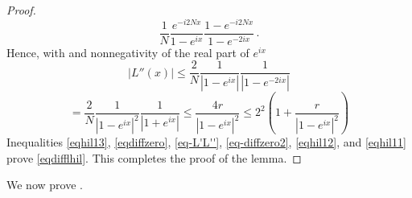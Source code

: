\begin{proof}
\begin{equation}
           \frac 1N \frac {e^{-i2Nx}}{1-e^{ix}}
     \frac{1-e^{-i2Nx}}{1-e^{-2ix}}\, .
\end{equation}
Hence, with  and nonnegativity of the real part of $e^{ix}$
\begin{equation*}
    |L''(x)|
 \le \frac 2 N \frac {1}{|1-e^{ix}|}
     \frac{1}{|1-e^{-2ix}|}
 \end{equation*}
\begin{equation}\label{eqhil11}
    = \frac 2 N \frac {1}{|1-e^{ix}|^2}
     \frac{1}{|1+e^{ix}|}\le
 \frac {4r}{|1-e^{ix}|^2}\le 2^{2} \left(1+\frac {r}{|1-e^{ix}|^2}\right)
\end{equation}
Inequalities \eqref{eqhil13}, \eqref{eqdiffzero}, \eqref{eq-L'L''}, \eqref{eq-diffzero2}, \eqref{eqhil12}, and \eqref{eqhil11} prove \eqref{eqdifflhil}. This completes the proof of the lemma.
\end{proof}


We now prove .

